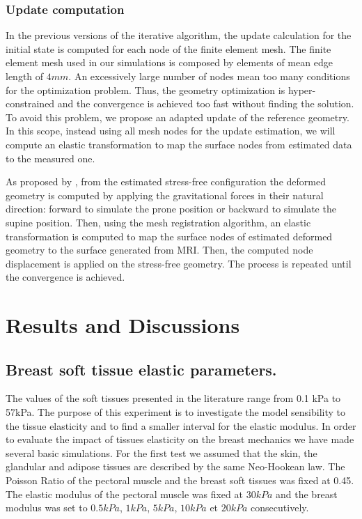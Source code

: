 \subsubsection*{Update computation}

In the previous versions of the iterative algorithm, the update calculation for the initial state is computed for each node of the finite element mesh. The finite element mesh used in our simulations is composed by elements of mean edge length of $4mm$. An excessively large number of nodes mean too many conditions for the optimization problem. Thus, the geometry optimization is hyper-constrained and the convergence is achieved too fast without finding the solution. To avoid this problem, we propose an adapted update of the reference geometry. In this scope, instead using all mesh nodes for the update estimation, we will compute an elastic transformation to map the surface nodes from estimated data to the measured one.

As proposed by \cite{ carter_biomechanical_2009}, from the estimated stress-free configuration the deformed geometry is computed by applying the gravitational forces in their natural direction: forward to simulate the prone position or backward to simulate the supine position. Then, using the mesh registration algorithm, an elastic transformation is computed to map the surface nodes of estimated deformed geometry to the surface generated from MRI. Then, the computed node displacement is applied on the stress-free geometry. The process is repeated until the convergence is achieved.


\section{Results and Discussions}
\subsection{Breast soft tissue elastic parameters.}
The values of the soft tissues presented in the literature range from 0.1 kPa to 57kPa. The purpose of this experiment is to investigate the model sensibility to the tissue elasticity and to find a smaller interval for the elastic modulus. In order to evaluate the impact of tissues elasticity on the breast mechanics we have made several basic simulations. For the first test we assumed that the skin, the glandular and adipose tissues are described by the same Neo-Hookean law. The Poisson Ratio of the pectoral muscle and the breast soft tissues was fixed at 0.45. The elastic modulus of the pectoral muscle was fixed at $30 kPa$ and the breast modulus was set to $0.5kPa$, $1kPa$, $5kPa$, $10kPa$ et $20kPa$ consecutively.

